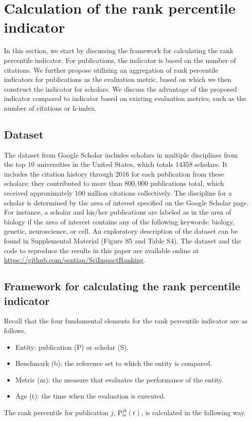 \section*{Calculation of the rank percentile indicator}

In this section, we start by discussing the framework for calculating the rank percentile indicator. For publications, the indicator is based on the number of citations. We further propose utilizing an aggregation of rank percentile indicators for publications as the evaluation metric, based on which we then construct the indicator for scholars. We discuss the advantage of the proposed indicator compared to indicator based on existing evaluation metrics, such as the number of citations or h-index. 

\subsection*{Dataset}

The dataset from Google Scholar includes scholars in multiple disciplines from the top $10$ universities in the United States, which totals $14358$ scholars. It includes the citation history through $2016$ for each publication from these scholars; they contributed to more than $800,000$ publications total, which received approximately $100$ million citations collectively. The discipline for a scholar is determined by the area of interest specified on the Google Scholar page. For instance, a scholar and his/her publications are labeled as in the area of biology if the area of interest contains any of the following keywords: biology, genetic, neuroscience, or cell. An exploratory description of the dataset can be found in Supplemental Material (Figure S5 and Table S4). The dataset and the code to reproduce the results in this paper are available online at \url{https://github.com/sentian/SciImpactRanking}.

\subsection*{Framework for calculating the rank percentile indicator}
Recall that the four fundamental elements for the rank percentile indicator are as follows. 
\begin{itemize}
    \item Entity: publication (P) or scholar (S).
    \item Benchmark (b): the reference set to which the entity is compared.
    \item Metric (m): the measure that evaluates the performance of the entity.
    \item Age (t): the time when the evaluation is executed.
\end{itemize}
The rank percentile for publication $j$, P$_{m}^{jb}(t)$, is calculated in the following way.

